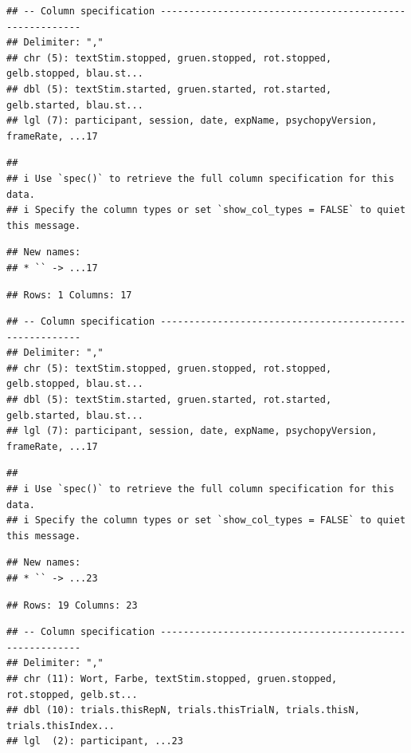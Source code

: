 \documentclass[
]{book}
\begin{document}
\begin{verbatim}
## -- Column specification --------------------------------------------------------
## Delimiter: ","
## chr (5): textStim.stopped, gruen.stopped, rot.stopped, gelb.stopped, blau.st...
## dbl (5): textStim.started, gruen.started, rot.started, gelb.started, blau.st...
## lgl (7): participant, session, date, expName, psychopyVersion, frameRate, ...17
\end{verbatim}

\begin{verbatim}
## 
## i Use `spec()` to retrieve the full column specification for this data.
## i Specify the column types or set `show_col_types = FALSE` to quiet this message.
\end{verbatim}

\begin{verbatim}
## New names:
## * `` -> ...17
\end{verbatim}

\begin{verbatim}
## Rows: 1 Columns: 17
\end{verbatim}

\begin{verbatim}
## -- Column specification --------------------------------------------------------
## Delimiter: ","
## chr (5): textStim.stopped, gruen.stopped, rot.stopped, gelb.stopped, blau.st...
## dbl (5): textStim.started, gruen.started, rot.started, gelb.started, blau.st...
## lgl (7): participant, session, date, expName, psychopyVersion, frameRate, ...17
\end{verbatim}

\begin{verbatim}
## 
## i Use `spec()` to retrieve the full column specification for this data.
## i Specify the column types or set `show_col_types = FALSE` to quiet this message.
\end{verbatim}

\begin{verbatim}
## New names:
## * `` -> ...23
\end{verbatim}

\begin{verbatim}
## Rows: 19 Columns: 23
\end{verbatim}

\begin{verbatim}
## -- Column specification --------------------------------------------------------
## Delimiter: ","
## chr (11): Wort, Farbe, textStim.stopped, gruen.stopped, rot.stopped, gelb.st...
## dbl (10): trials.thisRepN, trials.thisTrialN, trials.thisN, trials.thisIndex...
## lgl  (2): participant, ...23
\end{verbatim}
\end{document}
